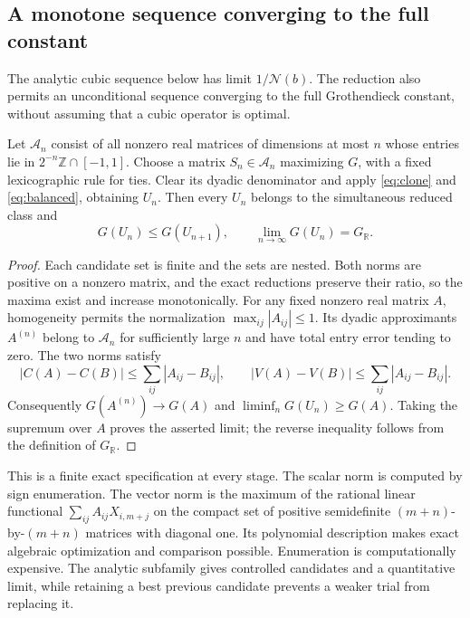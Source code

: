 \subsection{A monotone sequence converging to the full constant}
The analytic cubic sequence below has limit $1/\mathcal N(b)$.
The reduction also permits an unconditional sequence converging to the
full Grothendieck constant, without assuming that a cubic operator is
optimal.

\begin{proposition}\label{prop:universal-monotone}
Let $\mathcal A_n$ consist of all nonzero real matrices of dimensions
at most $n$ whose entries lie in
$2^{-n}\mathbb Z\cap[-1,1]$. Choose a matrix $S_n\in\mathcal A_n$
maximizing $G$, with a fixed lexicographic rule for ties. Clear its
dyadic denominator and apply \eqref{eq:clone} and \eqref{eq:balanced},
obtaining $U_n$. Then every $U_n$ belongs to the simultaneous reduced
class and
\[
 G(U_n)\le G(U_{n+1}),\qquad
 \lim_{n\to\infty}G(U_n)=G_{\mathbb R}.
\]
\end{proposition}
\begin{proof}
Each candidate set is finite and the sets are nested. Both norms are
positive on a nonzero matrix, and the exact reductions preserve their
ratio, so the maxima exist and increase monotonically.
For any fixed nonzero real matrix $A$, homogeneity permits the
normalization $\max_{ij}|A_{ij}|\le1$. Its dyadic approximants $A^{(n)}$
belong to $\mathcal A_n$ for sufficiently large $n$ and have total
entry error tending to zero. The two norms satisfy
\[
 |C(A)-C(B)|\le\sum_{ij}|A_{ij}-B_{ij}|,
 \qquad |V(A)-V(B)|\le\sum_{ij}|A_{ij}-B_{ij}|.
\]
Consequently $G(A^{(n)})\to G(A)$ and
$\liminf_nG(U_n)\ge G(A)$. Taking the supremum over $A$ proves the
asserted limit; the reverse inequality follows from the definition of
$G_{\mathbb R}$.
\end{proof}

This is a finite exact specification at every stage. The scalar norm is
computed by sign enumeration. The vector norm is the maximum of the
rational linear functional
$\sum_{ij}A_{ij}X_{i,m+j}$ on the compact set of positive semidefinite
$(m+n)$-by-$(m+n)$ matrices with diagonal one. Its polynomial
description makes exact algebraic optimization and comparison possible.
Enumeration is computationally expensive. The analytic subfamily gives
controlled candidates and a quantitative limit, while retaining a best
previous candidate prevents a weaker trial from replacing it.
